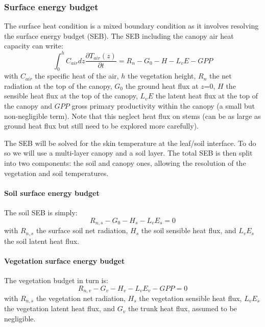 \documentclass[twoside,10pt]{report}
\begin{document}
\subsubsection{Surface energy budget}
The surface heat condition is a mixed boundary condition as it involves resolving the surface energy budget (SEB). The SEB including the canopy air heat capacity can write:
\begin{equation}
    \int_0^h{C_{air}dz \frac{\partial T_{air}(z)}{\partial t}} = R_n - G_0 - H - L_vE - GPP 
\end{equation}
with $C_{air}$ the specific heat of the air, $h$ the vegetation height, $R_n$ the net radiation at the top of the canopy, $G_0$ the ground heat flux at $z$=0, $H$ the sensible heat flux at the top of the canopy, $L_vE$ the latent heat flux at the top of the canopy and $GPP$ gross primary productivity within the canopy (a small but non-negligible term). Note that this neglect heat flux on stems (can be as large as ground heat flux but still need to be explored more carefully).

 The SEB will be solved for the skin temperature at the leaf/soil interface. To do so we will use a multi-layer canopy and a soil layer.
 The total SEB is then split into two components: the soil and canopy ones, allowing the resolution of the vegetation and soil temperatures.
 
\paragraph{Soil surface energy budget}
The soil SEB is simply:
\begin{equation}
     R_{n,s} - G_0 - H_s - L_vE_s = 0  
     \label{SEB:soil}
\end{equation}
with $R_{n,s}$ the surface soil net radiation, $H_s$ the soil sensible heat flux, and $L_vE_s$ the soil latent heat flux.

\paragraph{Vegetation surface energy budget}
The vegetation budget in turn is:
\begin{equation}
     R_{n,v} - G_v - H_v - L_vE_v - GPP = 0  
     \label{SEB:veg}
\end{equation}
with $R_{n,s}$ the vegetation net radiation, $H_s$ the vegetation sensible heat flux, $L_vE_s$ the vegetation latent heat flux, and $G_v$ the trunk heat flux, assumed to be negligible. 
\end{document}
